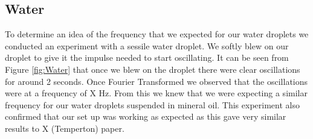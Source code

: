 \documentclass{physics_article_B}
\begin{document}
 	\subsection{Water}
 	
        To determine an idea of the frequency that we expected for our water droplets we conducted an experiment with a sessile water droplet. We softly blew on our droplet to give it the impulse needed to start oscillating. It can be seen from Figure \ref{fig:Water} that once we blew on the droplet there were clear oscillations for around 2 seconds. Once Fourier Transformed we observed that the oscillations were at a frequency of X Hz. From this we knew that we were expecting a similar frequency for our water droplets suspended in mineral oil. This experiment also confirmed that our set up was working as expected as this gave very similar results to X (Temperton) paper. 
 
\end{document}
